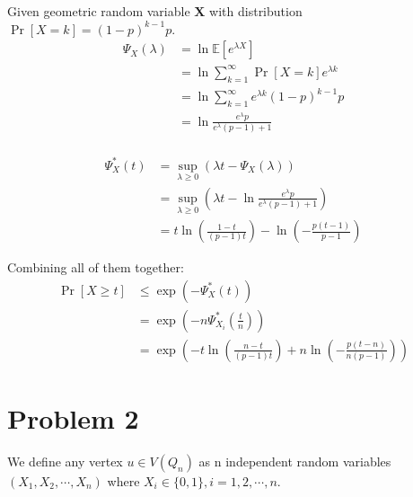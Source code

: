 \documentclass[a4paper, 12pt, titlepage]{article}
\begin{document}
Given geometric random variable $\mathbf{X}$ with distribution $\Pr \left[ X = k \right] = ( 1- p)^{k -1} p$.
\begin{equation}
    \begin{aligned}
        \Psi_{X}(\lambda) &= \ln \mathbb E \left[ e^{\lambda X} \right] \\
                          &= \ln \sum_{k = 1}^{\infty} \Pr \left[ X = k \right] e^{\lambda k} \\
                          &= \ln \sum_{k = 1}^{\infty} e^{\lambda k} (1-p)^{k - 1} p \\
                          &= \ln \frac{e^{\lambda } p}{e^{\lambda } (p-1)+1} \\
    \end{aligned}
\end{equation}

\begin{equation}
    \begin{aligned}
        \Psi_{X}^{*}(t) &= \sup_{\lambda \geq 0} \left( \lambda t - \Psi_{X}(\lambda) \right) \\
                        &= \sup_{\lambda \geq 0} \left( \lambda t - \ln \frac{e^{\lambda } p}{e^{\lambda } (p-1)+1} \right) \\
                        &= t \ln \left(\frac{1-t}{(p-1) t}\right)-\ln \left(-\frac{p (t-1)}{p-1}\right)
    \end{aligned}
\end{equation}

Combining all of them together:
\begin{equation}
    \begin{aligned}
        \Pr \left[ X \geq t \right] &\leq \exp \left( - \Psi_{X}^{*}(t) \right) \\
                                    &= \exp \left( - n \Psi_{X_{i}}^{*}(\frac{t}{n}) \right) \\
                                    &= \exp \left( - t \ln \left(\frac{n-t}{(p-1) t}\right) + n \ln \left(-\frac{p (t-n)}{n(p-1)}\right) \right)  
    \end{aligned}
\end{equation}

\section{Problem 2}

We define any vertex $u \in V(Q_n)$ as n independent random variables $(X_{1}, X_{2}, \cdots, X_{n}) $ where $X_{i} \in \{ 0, 1 \}, i = 1, 2, \cdots, n $.
\end{document}
